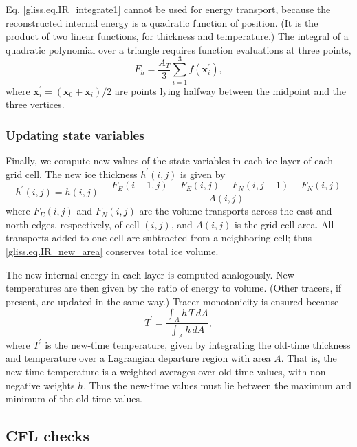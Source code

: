 Eq. \eqref{gliss.eq.IR_integrate1} cannot be used for energy transport, because
the reconstructed internal energy is a quadratic function of position.
(It is the product of two linear functions, for thickness and temperature.)
The integral of a quadratic polynomial over a triangle requires
function evaluations at three points,
\begin{equation}
  \label{gliss.eq.IR_integrate2}
  F_h = \frac{A_T}{3}\sum_{i=1}^3 f\left({\mathbf x}^\prime_i\right),
\end{equation}
where $\mathbf{x}_i^\prime = (\mathbf{x}_0+\mathbf{x}_i)/2$ are
points lying halfway between the midpoint and the three vertices.

\subsubsection{Updating state variables}
\label{sc:glissade-IR-update}

Finally, we compute new values of the state variables in each ice layer of each grid cell.
The new ice thickness $h^\prime(i,j)$ is given by
\begin{equation}
  \label{gliss.eq.IR_new_area}
  h^\prime(i,j) = h(i,j) + 
  \frac{F_{E}(i-1,j) - F_{E}(i,j) + F_{N}(i,j-1) - F_{N}(i,j)} {A(i,j)}
\end{equation}
where $F_{E}(i,j)$ and $F_{N}(i,j)$ are the volume transports across the
east and north edges, respectively, of cell $(i,j)$, and $A(i,j)$
is the grid cell area.   All transports added to one cell are
subtracted from a neighboring cell; thus \eqref{gliss.eq.IR_new_area}
conserves total ice volume.

The new internal energy in each layer is computed analogously.
New temperatures are then given by the ratio of energy to volume.
(Other tracers, if present, are updated in the same way.)
Tracer monotonicity is ensured because
\[ T^\prime = \frac{\int_A h \, T \, dA} {\int_A h \, dA}, \]
where $T^\prime$ is the new-time temperature, given by 
integrating the old-time thickness and temperature
over a Lagrangian departure region with area $A$. That is,
the new-time temperature is a weighted averages over
old-time values, with non-negative weights $h$. Thus the
new-time values must lie between the maximum and minimum of the
old-time values.

\subsection{CFL checks}
\label{sc:glissade-IR-CFL}

